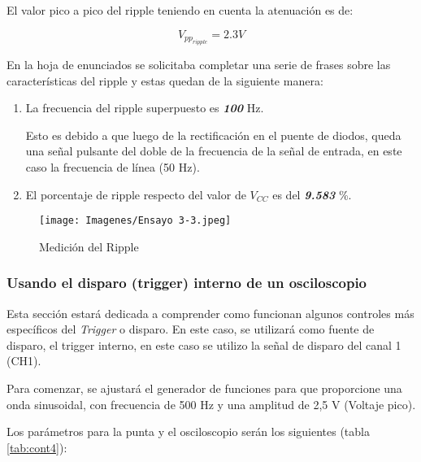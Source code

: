 El valor pico a pico del ripple teniendo en cuenta la atenuación es de:

$$V_{pp_{ripple}} = 2.3V$$

En la hoja de enunciados se solicitaba completar una serie de frases sobre las características del ripple y estas quedan de la siguiente manera:

\begin{enumerate}
    \item La frecuencia del ripple superpuesto es \textit{\textbf{100}} Hz. 
    
    Esto es debido a que luego de la rectificación en el puente de diodos, queda una señal pulsante del doble de la frecuencia de la señal de entrada, en este caso la frecuencia de línea (50 Hz).
    \item El porcentaje de ripple respecto del valor de $V_{CC}$ es del \textbf{\textit{9.583}} \%.
\end{enumerate}

\begin{figure}[H]
    \centering
    \texttt{[image: Imagenes/Ensayo 3-3.jpeg]}
    \caption{Medición del Ripple}
    \label{fig::MedicionRipple}
\end{figure}

\vspace{0.5cm}
\subsubsection{Usando el disparo (trigger) interno de un osciloscopio} 

Esta sección estará dedicada a comprender como funcionan algunos controles más específicos del \textit{Trigger} o disparo. En este caso, se utilizará como fuente de disparo, el trigger interno, en este caso se utilizo la señal de disparo del canal 1 (CH1).

Para comenzar, se ajustará el generador de funciones para que proporcione una onda sinusoidal, con frecuencia de 500 Hz y una amplitud de 2,5 V (Voltaje pico). 

Los parámetros para la punta y el osciloscopio serán los siguientes (tabla \ref{tab:cont4}):

\begin{table}[H]
    \centering
        \def\tablename{Tabla} 
        \caption{Cuadro de Controles}
        \label{tab:cont4}
\end{table}

